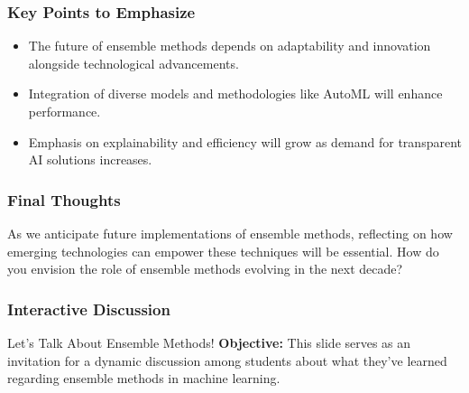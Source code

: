 \documentclass[aspectratio=169]{beamer}
\begin{document}
\begin{frame}[fragile]
    \frametitle{Key Points to Emphasize}
    \begin{itemize}
        \item The future of ensemble methods depends on adaptability and innovation alongside technological advancements.
        \item Integration of diverse models and methodologies like AutoML will enhance performance.
        \item Emphasis on explainability and efficiency will grow as demand for transparent AI solutions increases.
    \end{itemize}
\end{frame}

\begin{frame}[fragile]
    \frametitle{Final Thoughts}
    As we anticipate future implementations of ensemble methods, reflecting on how emerging technologies can empower these techniques will be essential. How do you envision the role of ensemble methods evolving in the next decade?
\end{frame}

\begin{frame}[fragile]
    \frametitle{Interactive Discussion}
    \begin{block}{Let’s Talk About Ensemble Methods!}
        \textbf{Objective:} This slide serves as an invitation for a dynamic discussion among students about what they’ve learned regarding ensemble methods in machine learning.
    \end{block}
\end{frame}
\end{document}
